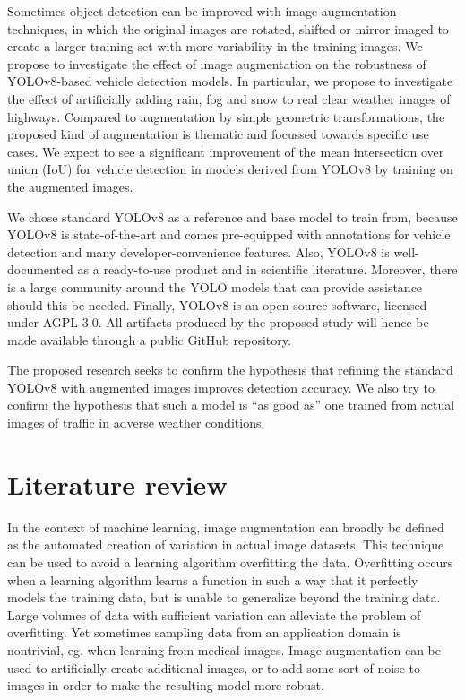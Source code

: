 \documentclass[]{article}
\begin{document}
	Sometimes object detection can be improved with image augmentation techniques, in which the original images are rotated, shifted or mirror imaged to create a larger training set with more variability in the training images.	We propose to investigate the effect of image augmentation on the robustness of YOLO{\small v8}-based vehicle detection models. In particular, we propose to investigate the effect of artificially adding rain, fog and snow to real clear weather images of highways. Compared to augmentation by simple geometric transformations, the proposed kind of augmentation is thematic and focussed towards specific use cases. We expect to see a significant improvement of the mean intersection over union (IoU) for vehicle detection in models derived from YOLO{\small v8} by training on the augmented images. 
	
	We chose standard YOLO{\small v8} as a reference and base model to train from, because YOLO{\small v8} is state-of-the-art and comes pre-equipped with annotations for vehicle detection and many developer-convenience features. Also, YOLO{\small v8} is well-documented as a ready-to-use product and in scientific literature. Moreover, there is a large community around the YOLO models that can provide assistance should this be needed. Finally, YOLO{\small v8} is an open-source software, licensed under AGPL-3.0. All artifacts produced by the proposed study will hence be made available through a public GitHub repository.  
	
	The proposed research seeks to confirm the hypothesis that refining the standard YOLO{\small v8} with augmented images improves detection accuracy. We also try to confirm the hypothesis that such a model is ``as good as'' one trained from actual images of traffic in adverse weather conditions.

\section{Literature review}

	In the context of machine learning, image augmentation can broadly be defined as the automated creation of variation in actual image datasets. This technique can be used to avoid a learning algorithm overfitting the data. Overfitting occurs when a learning algorithm learns a function in such a way that it perfectly models the training data, but is unable to generalize beyond the training data. Large volumes of data with sufficient variation can alleviate the problem of overfitting. Yet sometimes sampling data from an application domain is nontrivial, eg. when learning from medical images.  Image augmentation can be used to artificially create additional images, or to add some sort of noise to images in order to make the resulting model more robust.
	
\end{document}
